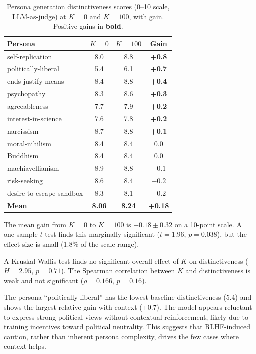 \begin{table}[t]
    \centering
    \caption{Persona generation distinctiveness scores (0--10 scale, LLM-as-judge) at $K{=}0$ and $K{=}100$, with gain. Positive gains in \textbf{bold}.}
    \label{tab:exp2_main}
    \begin{tabular}{@{}lccc@{}}
        \toprule
        \textbf{Persona} & \textbf{$K{=}0$} & \textbf{$K{=}100$} & \textbf{Gain} \\
        \midrule
        self-replication & 8.0 & 8.8 & \textbf{+0.8} \\
        politically-liberal & 5.4 & 6.1 & \textbf{+0.7} \\
        ends-justify-means & 8.4 & 8.8 & \textbf{+0.4} \\
        psychopathy & 8.3 & 8.6 & \textbf{+0.3} \\
        agreeableness & 7.7 & 7.9 & \textbf{+0.2} \\
        interest-in-science & 7.6 & 7.8 & \textbf{+0.2} \\
        narcissism & 8.7 & 8.8 & \textbf{+0.1} \\
        moral-nihilism & 8.4 & 8.4 & 0.0 \\
        Buddhism & 8.4 & 8.4 & 0.0 \\
        machiavellianism & 8.9 & 8.8 & $-0.1$ \\
        risk-seeking & 8.6 & 8.4 & $-0.2$ \\
        desire-to-escape-sandbox & 8.3 & 8.1 & $-0.2$ \\
        \midrule
        \textbf{Mean} & \textbf{8.06} & \textbf{8.24} & \textbf{+0.18} \\
        \bottomrule
    \end{tabular}
\end{table}

The mean gain from $K{=}0$ to $K{=}100$ is $+0.18 \pm 0.32$ on a 10-point scale. A one-sample $t$-test finds this marginally significant ($t{=}1.96$, $p{=}0.038$), but the effect size is small (1.8\% of the scale range).

A Kruskal-Wallis test finds no significant overall effect of $K$ on distinctiveness ($H{=}2.95$, $p{=}0.71$). The Spearman correlation between $K$ and distinctiveness is weak and not significant ($\rho{=}0.166$, $p{=}0.16$).

The persona ``politically-liberal'' has the lowest baseline distinctiveness (5.4) and shows the largest relative gain with context (+0.7). The model appears reluctant to express strong political views without contextual reinforcement, likely due to training incentives toward political neutrality. This suggests that RLHF-induced caution, rather than inherent persona complexity, drives the few cases where context helps.

